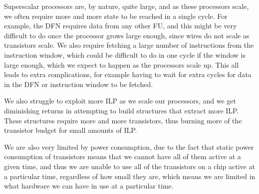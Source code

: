 \begin{enumerate}[label=(\alph*)]
    Superscalar processors are, by nature, quite large, and as these processors scale, we often require more and more state to be reached in a single cycle. For example, the DFN requires data from any other FU, and this might be very difficult to do once the processor grows large enough, since wires do not scale as transistors scale. We also require fetching a large number of instructions from the instruction window, which could be difficult to do in one cycle if the window is large enough, which we expect to happen as the processors scale up. This all leads to extra complications, for example having to wait for extra cycles for data in the DFN or instruction window to be fetched.

    We also struggle to exploit more ILP as we scale our processors, and we get diminishing returns in attempting to build structures that extract more ILP. These structures require more and more transistors, thus burning more of the transistor budget for small amounts of ILP.

    We are also very limited by power consumption, due to the fact that static power consumption of transistors means that we cannot have all of them active at a given time, and thus we are unable to use all of the transistors on a chip active at a particular time, regardless of how small they are, which means we are limited in what hardware we can have in use at a particular time.
        
    \end{enumerate}


